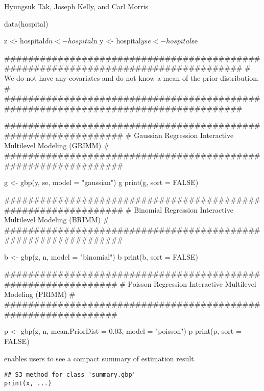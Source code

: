 \documentclass[a4paper]{book}
\begin{document}
%
\begin{Author}\relax
Hyungsuk Tak, Joseph Kelly, and Carl Morris
\end{Author}
%
\begin{Examples}
\begin{ExampleCode}

  data(hospital)

  z <- hospital$d
  n <- hospital$n
  y <- hospital$y
  se <- hospital$se
  
  ###################################################################################
  # We do not have any covariates and do not know a mean of the prior distribution. #
  ###################################################################################

    ###############################################################
    # Gaussian Regression Interactive Multilevel Modeling (GRIMM) #
    ###############################################################

    g <- gbp(y, se, model = "gaussian")
    g
    print(g, sort = FALSE)

    ###############################################################
    # Binomial Regression Interactive Multilevel Modeling (BRIMM) #
    ###############################################################

    b <- gbp(z, n, model = "binomial")
    b
    print(b, sort = FALSE)

    ##############################################################
    # Poisson Regression Interactive Multilevel Modeling (PRIMM) #
    ##############################################################

    p <- gbp(z, n, mean.PriorDist = 0.03, model = "poisson")
    p
    print(p, sort = FALSE)

\end{ExampleCode}
\end{Examples}
%
\begin{Description}\relax
{} enables users to see a compact summary of estimation result.
\end{Description}
%
\begin{Usage}
\begin{verbatim}
## S3 method for class 'summary.gbp'
print(x, ...)
\end{verbatim}
\end{Usage}
\end{document}
